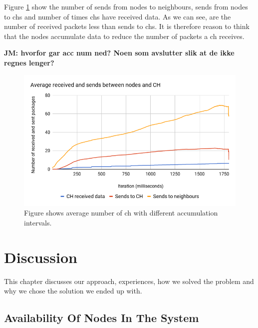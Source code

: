 \documentclass[USenglish]{uit-thesis}
\begin{document}
Figure \ref{fig:sentvsrecvChart} show the number of sends from nodes to neighbours, sends from nodes to \gls{ch}s and number of times \gls{ch}s have received data. As we can see, are the number of received packets less than sends to \glspl{ch}. It is therefore reason to think that the nodes accumulate data to reduce the number of packets a \gls{ch} receives.

\textbf{JM: hvorfor gar acc num ned? Noen som avslutter slik at de ikke regnes lenger?}


\begin{figure} [ht]
\centering
\includegraphics[width=\textwidth]{sentVsRecvChart.png}
\caption{Figure shows average number of \gls{ch} with different accumulation intervals.}
\label{fig:sentvsrecvChart}
\end{figure}




\chapter{Discussion}
\glsresetall

This chapter discusses our approach, experiences, how we solved the problem and why we chose the solution we ended up with.

\section{Availability Of Nodes In The System} \label{disc:node_conn}
\end{document}
